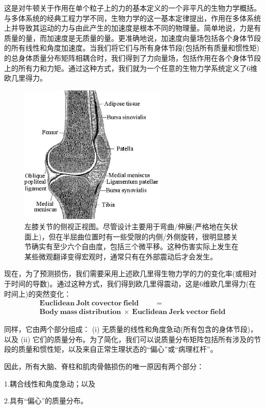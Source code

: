 \documentclass[11pt,fontset=founder]{ctexart}
\begin{document}
这是对牛顿关于作用在单个粒子上的力的基本定义的一个非平凡的生物力学概括。与多体系统的经典工程力学不同，生物力学的这一基本定律提出，作用在多体系统上并导致其运动的力与由此产生的加速度是根本不同的物理量。简单地说，力是有质量的量，而加速度是无质量的量。更准确地说，加速度向量场包括各个身体节段的所有线性和角度加速度。当我们将它们与所有身体节段(包括所有质量和惯性矩)的总身体质量分布矩阵相耦合时，我们得到了力向量场，包括作用在各个身体节段上的所有力和力矩。通过这种方式，我们就为一个任意的生物力学系统定义了6维欧几里得力。
\begin{figure}[h]
\centerline{\includegraphics[width=7cm]{KneeInj}}
\caption{左膝关节的侧视正视图。尽管设计主要用于弯曲/伸展(严格地在矢状面上)，但在半屈曲位置时有一些受限的内侧/外侧旋转，很明显膝关节确实有至少六个自由度，包括三个微平移。这种伤害实际上发生在某些微观翻译变得宏观时，通常只有在外部震动后才会发生。}
\label{KneeInj}
\end{figure}

现在，为了预测损伤，我们需要采用上述欧几里得生物力学的力的变化率(或相对于时间的导数)。通过这种方式，我们得到欧几里得震动，这是6维欧几里得力(在时间上)的突然变化：
\begin{eqnarray*}
\mathbf{Euclidean\ Jolt\ covector\ field\ } \qquad\mathbf{=\ } \\
\mathbf{Body\ mass\ distribution\ \times \ Euclidean\ Jerk\ vector\ field}
\end{eqnarray*}

同样，它由两个部分组成： (i) 无质量的线性和角度急动(所有包含的身体节段)，以及 (ii) 它们的质量分布。为了简化，我们可以说质量分布矩阵包括所有涉及的节段的质量和惯性矩，以及来自正常生理状态的“偏心”或“病理杠杆”。\newline

因此，所有大脑、脊柱和肌肉骨骼损伤的唯一原因有两个部分：

1.\quad 耦合线性和角度急动；以及

2.\quad 具有“偏心”的质量分布。\newline
\end{document}
